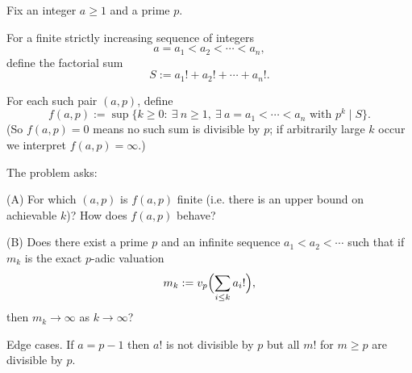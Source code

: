 Fix an integer $a\ge 1$ and a prime $p$.

For a finite strictly increasing sequence of integers
\[
a=a_1<a_2<\cdots<a_n,
\]
define the factorial sum
\[
S:=a_1!+a_2!+\cdots+a_n!.
\]

For each such pair $(a,p)$, define
\[
f(a,p):=\sup\{k\ge 0:\ \exists\ n\ge 1,\ \exists\ a=a_1<\cdots<a_n\text{ with }p^k\mid S\}.
\]
(So $f(a,p)=0$ means no such sum is divisible by $p$; if arbitrarily large $k$ occur we interpret $f(a,p)=\infty$.)

The problem asks:

(A) For which $(a,p)$ is $f(a,p)$ finite (i.e. there is an upper bound on achievable $k$)? How does $f(a,p)$ behave?

(B) Does there exist a prime $p$ and an infinite sequence $a_1<a_2<\cdots$ such that if $m_k$ is the exact $p$-adic valuation
\[
m_k:=v_p\Bigl(\sum_{i\le k} a_i!\Bigr),
\]
then $m_k\to\infty$ as $k\to\infty$?

Edge cases.
If $a=p-1$ then $a!$ is not divisible by $p$ but all $m!$ for $m\ge p$ are divisible by $p$.
